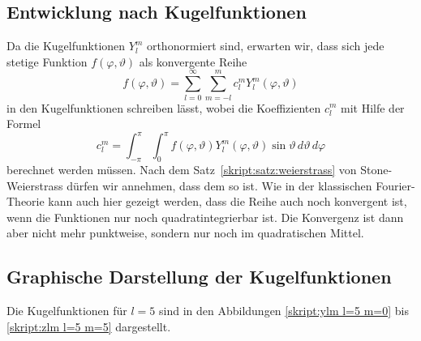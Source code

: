 \subsection{Entwicklung nach Kugelfunktionen}
Da die Kugelfunktionen $Y^m_l$ orthonormiert sind, erwarten wir, dass sich 
jede stetige Funktion $f(\varphi,\vartheta)$ als konvergente Reihe
\begin{equation}
f(\varphi,\vartheta)
=
\sum_{l=0}^\infty
\sum_{m=-l}^m c_l^m Y_l^m(\varphi,\vartheta)
\end{equation}
in den Kugelfunktionen schreiben lässt, wobei die
Koeffizienten $c_l^m$
mit Hilfe der Formel
\begin{equation}
c_l^m
=
\int_{-\pi}^\pi
\int_0^\pi
f(\varphi,\vartheta)Y^m_l(\varphi,\vartheta)
\sin\vartheta
\,d\vartheta
\,d\varphi
\end{equation}
berechnet werden müssen.
Nach dem Satz~\ref{skript:satz:weierstrass} von Stone-Weierstrass
dürfen wir annehmen, dass dem so ist.
Wie in der klassischen Fourier-Theorie kann auch hier gezeigt werden,
dass die Reihe auch noch konvergent ist, wenn die Funktionen nur noch
quadratintegrierbar ist.
Die Konvergenz ist dann aber nicht mehr punktweise, sondern nur noch
im quadratischen Mittel.

\subsection{Graphische Darstellung der Kugelfunktionen}
Die Kugelfunktionen für $l=5$ sind in den Abbildungen
\ref{skript:ylm l=5 m=0} bis \ref{skript:zlm l=5 m=5}
dargestellt.

